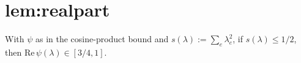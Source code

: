 \chapter{lem:realpart}\label{chap:lem_realpart}
\begin{lemma}
\label{lem:realpart}
With $\psi$ as in the cosine-product bound and
$s(\lambda) := \sum_{e}\lambda_e^2$, if $s(\lambda) \le 1/2$, then
$\mathrm{Re}\,\psi(\lambda) \in [3/4, 1]$.
\end{lemma}
